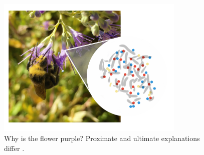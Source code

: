\begin{figure}
    \centering
    \includegraphics[width=0.8\textwidth]{img/proximate_ultimate}
 	\captionsetup{singlelinecheck=off,justification=raggedright}
  	\caption{Why is the flower purple? Proximate and ultimate explanations differ \cite{Wilson2007EvolutionLives}.}
    \label{fig:proximate_ultimate}
\end{figure}